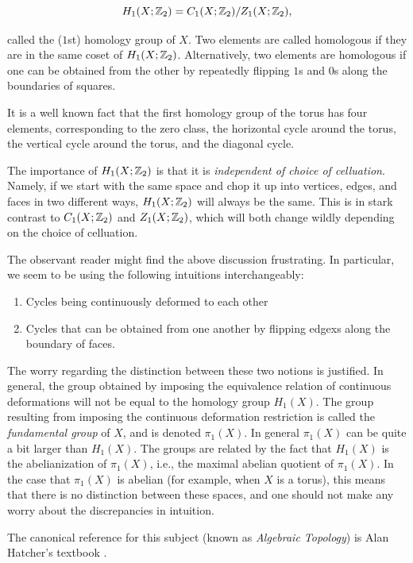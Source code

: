 \documentclass{article}
\theoremstyle{definition}
\numberwithin{figure}{section}
\begin{document}
$$H_1(X;\mathbb{Z}_2)=C_1(X;\mathbb{Z}_2)/Z_1(X;\mathbb{Z}_2),$$

called the ($1$st) homology group of $X$. Two elements are called homologous if they are in the same coset of $H_1(X;\mathbb{Z}_2)$. Alternatively, two elements are homologous if one can be obtained from the other by repeatedly flipping $1$s and $0$s along the boundaries of squares.

It is a well known fact that the first homology group of the torus has four elements, corresponding to the zero class, the horizontal cycle around the torus, the vertical cycle around the torus, and the diagonal cycle.

The importance of $H_1(X;\mathbb{Z}_2)$ is that it is \textit{independent of choice of celluation}. Namely, if we start with the same space and chop it up into vertices, edges, and faces in two different ways, $H_1(X;\mathbb{Z}_2)$ will always be the same. This is in stark contrast to $C_1(X;\mathbb{Z}_2)$ and $Z_1(X;\mathbb{Z}_2)$, which will both change wildly depending on the choice of celluation.

The observant reader might find the above discussion frustrating. In particular, we seem to be using the following intuitions interchangeably:

\begin{enumerate}
\item Cycles being continuously deformed to each other
\item Cycles that can be obtained from one another by flipping edgexs along the boundary of faces.
\end{enumerate}

The worry regarding the distinction between these two notions is justified. In general, the group obtained by imposing the equivalence relation of continuous deformations will not be equal to the homology group $H_1(X)$. The group resulting from imposing the continuous deformation restriction is called the \textit{fundamental group} of $X$, and is denoted $\pi_1(X)$. In general $\pi_1(X)$ can be quite a bit larger than $H_1(X)$. The groups are related by the fact that $H_1(X)$ is the abelianization of $\pi_1(X)$, i.e., the maximal abelian quotient of $\pi_1(X)$. In the case that $\pi_1(X)$ is abelian (for example, when $X$ is a torus), this means that there is no distinction between these spaces, and one should not make any worry about the discrepancies in intuition.

The canonical reference for this subject (known as \textit{Algebraic Topology}) is Alan Hatcher's textbook \cite{hatcher2005algebraic}.
\end{document}
